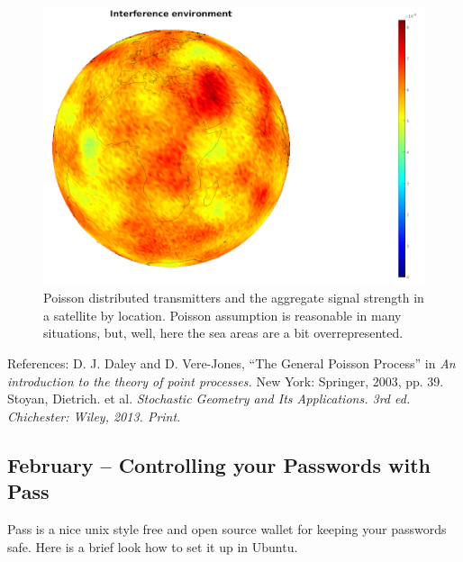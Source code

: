 \documentclass{article}
\begin{document}
\begin{figure}
  \includegraphics[width=\linewidth]{interferenceenvironment.png}
  \caption{Poisson distributed transmitters and the aggregate signal strength in a satellite by location. Poisson assumption is reasonable in many situations, but, well, here the sea areas are a bit overrepresented.  }
\end{figure}

References:
 D. J. Daley and D. Vere-Jones, ``The General Poisson Process'' in {\em An introduction to the theory of point processes.} New York: Springer, 2003, pp. 39. 
 Stoyan, Dietrich. et al. \em{Stochastic Geometry and Its Applications}. 3rd ed. Chichester: Wiley, 2013. Print.




\subsection{February – Controlling your Passwords with Pass}
Pass is a nice unix style free and open source wallet for keeping your passwords safe. Here is a brief look how to set it up in Ubuntu.
\end{document}
